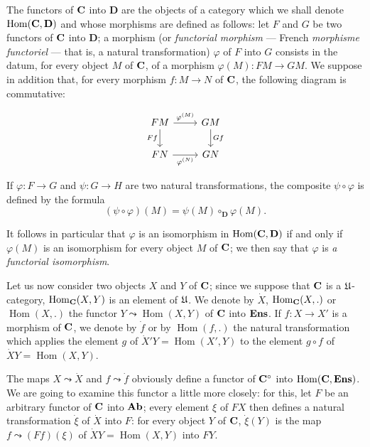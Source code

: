 The functors of $\mathbf{C}$ into $\mathbf{D}$ are the objects of a category which we
shall denote $\operatorname{Hom}(\mathbf{C},\mathbf{D})$ and whose morphisms are
defined as follows: let $F$ and $G$ be two functors of $\mathbf{C}$ into $\mathbf{D}$;
a morphism (or \emph{functorial morphism} --- French \emph{morphisme
functoriel} --- that is, a natural transformation) $\varphi$ of $F$ into $G$
consists in the datum, for every object $M$ of $\mathbf{C}$, of a morphism
$\varphi(M)\colon FM\to GM$. We suppose in addition that, for every morphism
$f\colon M\to N$ of $\mathbf{C}$, the following diagram is commutative:

\[
\begin{tikzcd}
FM \arrow[r, "\varphi^{(M)}"] \arrow[d, "Ff"'] & GM \arrow[d, "Gf"] \\
FN \arrow[r, "\varphi^{(N)}"'] & GN
\end{tikzcd}
\]

If $\varphi\colon F\to G$ and $\psi\colon G\to H$ are two natural
transformations, the composite $\psi\circ\varphi$ is defined by the formula
\[
  (\psi\circ\varphi)(M) = \psi(M)\circ_{\mathbf{D}}\varphi(M).
\]

It follows in particular that $\varphi$ is an isomorphism in
$\operatorname{Hom}(\mathbf{C},\mathbf{D})$ if and only if $\varphi(M)$ is an
isomorphism for every object $M$ of $\mathbf{C}$; we then say that $\varphi$ is
\emph{a functorial isomorphism}.

Let us now consider two objects $X$ and $Y$ of $\mathbf{C}$; since we suppose that
$\mathbf{C}$ is a $\mathfrak{U}$-category, $\operatorname{Hom}_{\mathbf{C}}(X,Y)$ is an element of
$\mathfrak{U}$. We denote by $\dot X$, $\operatorname{Hom}_{\mathbf{C}}(X,.)$ or
$\operatorname{Hom}(X,.)$ the functor $Y\leadsto\operatorname{Hom}(X,Y)$
of $\mathbf{C}$ into $\mathbf{Ens}$. If $f\colon X\to X'$ is a morphism of $\mathbf{C}$, we denote
by $\dot f$ or by $\operatorname{Hom}(f,.)$ the natural transformation which
applies the element $g$ of $\dot X' Y = \operatorname{Hom}(X',Y)$ to the
element $g\circ f$ of $\dot X Y = \operatorname{Hom}(X,Y)$.

The maps $X\leadsto\dot X$ and $f\leadsto\dot f$ obviously define a functor of
$\mathbf{C}^{\circ}$ into $\operatorname{Hom}(\mathbf{C},\mathbf{Ens})$. We are going to examine
this functor a little more closely: for this, let $F$ be an arbitrary functor
of $\mathbf{C}$ into $\mathbf{Ab}$; every element $\xi$ of $FX$ then defines a natural
transformation $\dot\xi$ of $\dot X$ into $F$: for every object $Y$ of $\mathbf{C}$,
$\dot\xi(Y)$ is the map $f\leadsto(Ff)(\xi)$ of
$\dot X Y = \operatorname{Hom}(X,Y)$ into $FY$.

